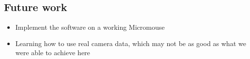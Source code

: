 \documentclass[10pt,twocolumn,letterpaper]{article}
\begin{document}
\subsection{Future work}
\label{sub:futurework}
\begin{itemize}
	\item Implement the software on a working Micromouse
	\item Learning how to use real camera data, which may not be as good as what we were able to achieve here
\end{itemize}

{\small


}
\end{document}
